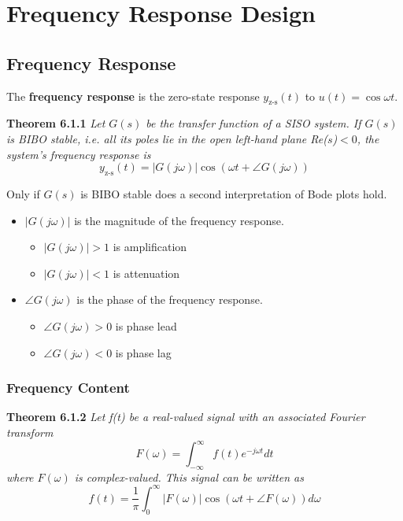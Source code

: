 \documentclass[letterpaper,12pt]{article}
\begin{document}
\section{Frequency Response Design}
\subsection{Frequency Response}
The \textbf{frequency response} is the zero-state response $y_{\text{z-s}}(t)$ to $u(t) = \cos\omega t$.

\textbf{Theorem 6.1.1} \textit{Let $G(s)$ be the transfer function of a SISO system. If $G(s)$ is BIBO stable,
i.e. all its poles lie in the open left-hand plane Re($s$)$<0$, the system's frequency response is}
\begin{equation*}
    y_{\text{z-s}}(t) = |G(j\omega)|\cos(\omega t + \angle G(j\omega))
\end{equation*}

Only if $G(s)$ is BIBO stable does a second interpretation of Bode plots hold.
\begin{itemize}
    \item $|G(j\omega)|$ is the magnitude of the frequency response.
    \begin{itemize}
        \item $|G(j\omega)|>1$ is amplification
        \item $|G(j\omega)|<1$ is attenuation
    \end{itemize}
    \item $\angle G(j\omega)$ is the phase of the frequency response.
    \begin{itemize}
        \item $\angle G(j\omega) > 0$ is phase lead
        \item $\angle G(j\omega) < 0$ is phase lag
    \end{itemize}
\end{itemize}

\subsubsection{Frequency Content}
\textbf{Theorem 6.1.2} \textit{Let f(t) be a real-valued signal with an associated Fourier transform}
\begin{equation*}
    F(\omega) = \int_{-\infty}^{\infty} f(t) e^{-j\omega t} dt
\end{equation*}
\textit{where $F(\omega)$ is complex-valued. This signal can be written as}
\begin{equation*}
    f(t) = \frac{1}{\pi} \int_{0}^{\infty} |F(\omega)| \cos(\omega t + \angle F(\omega)) d\omega
\end{equation*}
\end{document}
